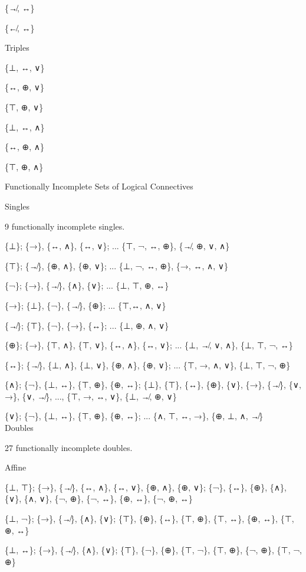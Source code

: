 \{↛, ↔\}

\{↚, ↔\}

\protect\hypertarget{anchor-5}{}{}Triples

\{⊥, ↔, ∨\}

\{↔, ⊕, ∨\}

\{⊤, ⊕, ∨\}

\{⊥, ↔, ∧\}

\{↔, ⊕, ∧\}

\{⊤, ⊕, ∧\}

\protect\hypertarget{anchor-6}{}{}Functionally Incomplete Sets of
Logical Connectives

\protect\hypertarget{anchor-7}{}{}Singles

9 functionally incomplete singles.

\{⊥\}; \{→\}, \{↔, ∧\}, \{↔, ∨\}; ... \{⊤, ¬, ↔, ⊕\}, \{↛, ⊕, ∨, ∧\}

\{⊤\}; \{↛\}, \{⊕, ∧\}, \{⊕, ∨\}; ... \{⊥, ¬, ↔, ⊕\}, \{→, ↔, ∧, ∨\}

\{¬\}; \{→\}, \{↛\}, \{∧\}, \{∨\}; ... \{⊥, ⊤, ⊕, ↔\}

\{→\}; \{⊥\}, \{¬\}, \{↛\}, \{⊕\}; ... \{⊤,↔, ∧, ∨\}

\{↛\}; \{⊤\}, \{¬\}, \{→\}, \{↔\}; ... \{⊥, ⊕, ∧, ∨\}

\{⊕\}; \{→\}, \{⊤, ∧\}, \{⊤, ∨\}, \{↔, ∧\}, \{↔, ∨\}; ... \{⊥, ↛, ∨,
∧\}, \{⊥, ⊤, ¬, ↔\}

\{↔\}; \{↛\}, \{⊥, ∧\}, \{⊥, ∨\}, \{⊕, ∧\}, \{⊕, ∨\}; ... \{⊤, →, ∧,
∨\}, \{⊥, ⊤, ¬, ⊕\}

\{∧\}; \{¬\}, \{⊥, ↔\}, \{⊤, ⊕\}, \{⊕, ↔\}; \{⊥\}, \{⊤\}, \{↔\}, \{⊕\},
\{∨\}, \{→\}, \{↛\}, \{∨, →\}, \{∨, ↛\}, ..., \{⊤, →, ↔, ∨\}, \{⊥, ↛, ⊕,
∨\}

\{∨\}; \{¬\}, \{⊥, ↔\}, \{⊤, ⊕\}, \{⊕, ↔\}; ... \{∧, ⊤, ↔, →\}, \{⊕, ⊥,
∧, ↛\}\\

\protect\hypertarget{anchor-8}{}{}Doubles

27 functionally incomplete doubles.

\protect\hypertarget{anchor-9}{}{}Affine

\{⊥, ⊤\}; \{→\}, \{↛\}, \{↔, ∧\}, \{↔, ∨\}, \{⊕, ∧\}, \{⊕, ∨\}; \{¬\},
\{↔\}, \{⊕\}, \{∧\}, \{∨\}, \{∧, ∨\}, \{¬, ⊕\}, \{¬, ↔\}, \{⊕, ↔\}, \{¬,
⊕, ↔\}

\{⊥, ¬\}; \{→\}, \{↛\}, \{∧\}, \{∨\}; \{⊤\}, \{⊕\}, \{↔\}, \{⊤, ⊕\},
\{⊤, ↔\}, \{⊕, ↔\}, \{⊤, ⊕, ↔\}

\{⊥, ↔\}; \{→\}, \{↛\}, \{∧\}, \{∨\}; \{⊤\}, \{¬\}, \{⊕\}, \{⊤, ¬\},
\{⊤, ⊕\}, \{¬, ⊕\}, \{⊤, ¬, ⊕\}

